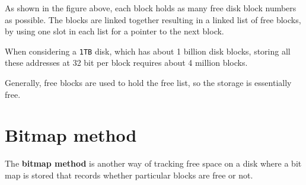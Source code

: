 \documentclass[a4paper]{systems-software}
\begin{document}
As shown in the figure above, each block holds as many free disk block numbers as possible. The blocks are linked together resulting in a linked list of free blocks, by using one slot in each list for a pointer to the next block.

When considering a \texttt{1TB} disk, which has about 1 billion disk blocks, storing all these addresses at 32 bit per block requires about 4 million blocks.
 
 Generally, free blocks are used to hold the free list, so the storage is essentially free.


\newpage

\section*{Bitmap method}

The \textbf{bitmap method} is another way of tracking free space on a disk where a bit map is stored that records whether particular blocks are free or not.
\end{document}
